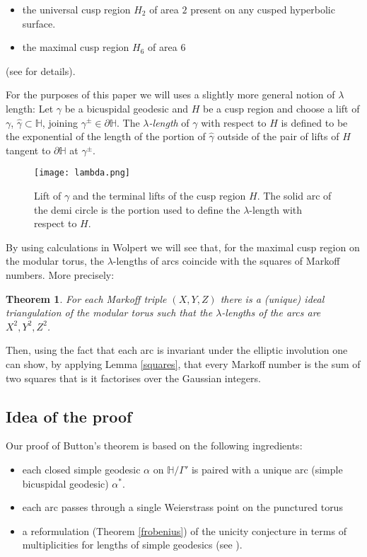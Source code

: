 \documentclass[12pt,a4paper]{amsart}
\newtheorem{thm}{Theorem}[section]
\def\HH{\mathbb{H}}
\def\xx{\HH/\Gamma'}
\begin{document}
\begin{itemize}
\item the universal cusp region $H_2$  of area $2$ present on any cusped hyperbolic surface.
\item the  maximal cusp region $H_6$ of area $6$ 
\end{itemize}
(see \cite{thesis} for details).

For the purposes of this paper we will uses a slightly more general notion of
$\lambda$ length: Let $\gamma$ be a bicuspidal geodesic and $H$ be a cusp
region and choose a lift of  
$\gamma$, $\hat{\gamma}\subset \HH$,
joining $\gamma^\pm \in \partial \HH$.
The \textit{$\lambda$-length} of $\gamma$ with respect to $H$ is
defined to be the exponential of the length of the portion of $\hat{\gamma}$ 
outside of the pair of lifts of $H$ tangent to $\partial \HH$ at $\gamma^\pm$.

\begin{figure}[ht]
\begin{center}
\texttt{[image: lambda.png]}
\end{center}
\caption{Lift of $\gamma$ and the terminal lifts of the cusp region $H$.
The solid arc of the demi circle is the portion used to define the $\lambda$-length  with respect to $H$.}
	\label{fig:torus}
\end{figure}

 By using calculations in Wolpert \cite{saw} we will see that, for the maximal
 cusp region on the modular torus,  the $\lambda$-lengths of arcs coincide with
 the squares of Markoff numbers. More precisely:
 
\begin{thm}
For each  Markoff triple $(X,Y,Z)$
there is a (unique) ideal triangulation of the modular torus
such that the $\lambda$-lengths of the arcs are 
$X^2,Y^2,Z^2$.
\end{thm}

 Then, using the fact that each arc is invariant under the elliptic involution
 one can show, by applying Lemma \ref{squares}, that every Markoff number is
 the sum of two squares that is it factorises over the Gaussian integers.

 \subsection{Idea of the proof}

Our proof of Button's theorem is based on the following ingredients: 
\begin{itemize}
\item each closed simple geodesic $\alpha$ on $\xx$ is paired with a unique arc (simple bicuspidal geodesic) $\alpha^*$. 
\item each arc passes through a single Weierstrass point on the punctured torus
\item a reformulation (Theorem \ref{frobenius}) of the unicity conjecture in terms of multiplicities for lengths of simple geodesics (see \cite{mcp}).
\end{itemize}
\end{document}
